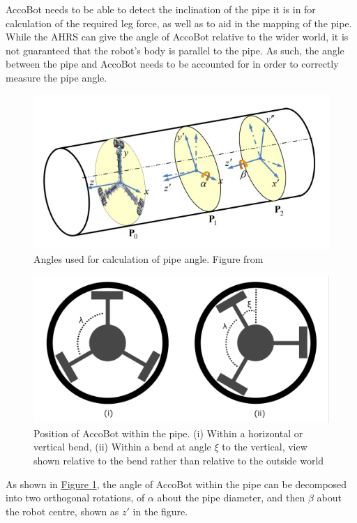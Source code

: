 \documentclass[11pt]{article}		%
\newlength{\imageheight}	 %
\newcommand{\figref}[1]{\hyperref[#1]{Figure \ref*{#1}}}    %
\begin{document}
			AccoBot needs to be able to detect the inclination of the pipe it is in for calculation of the required leg force, as well as to aid in the mapping of the pipe.
			While the AHRS can give the angle of AccoBot relative to the wider world, it is not guaranteed that the robot's body is parallel to the pipe.
			As such, the angle between the pipe and AccoBot needs to be accounted for in order to correctly measure the pipe angle.
			\\
			\begin{figure}[h]
				\centering
				\includegraphics[height=\imageheight]{pipeOrientation}
				\caption{Angles used for calculation of pipe angle. Figure from \cite{park2010normal}}
				\label{pipeOrientation}
			\end{figure}
			\begin{figure}[h]
				\centering
				\includegraphics[height=\imageheight]{pipeAngle}
				\caption{Position of AccoBot within the pipe. (i) Within a horizontal or vertical bend, (ii) Within a bend at angle $\xi$ to the vertical, view shown relative to the bend rather than relative to the outside world}
				\label{pipeAngle}
			\end{figure}
			As shown in \figref{pipeOrientation}, the angle of AccoBot within the pipe can be decomposed into two orthogonal rotations, of $\alpha$ about the pipe diameter, and then $\beta$ about the robot centre, shown as $z'$ in the figure.
\end{document}
